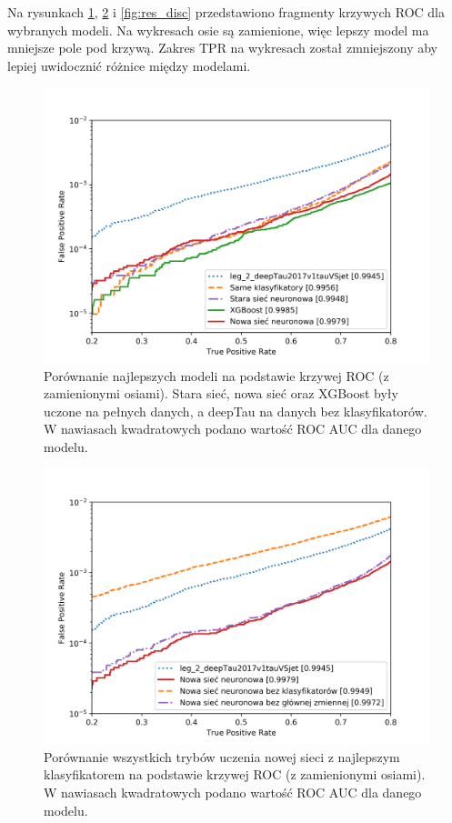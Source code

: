 \documentclass{pracalicmgr}
\begin{document}
	
	Na rysunkach \ref{fig:res_best}, \ref{fig:res_new} i \ref{fig:res_disc} przedstawiono fragmenty krzywych ROC dla wybranych modeli. Na wykresach osie są zamienione, więc lepszy model ma mniejsze pole pod krzywą. Zakres TPR na wykresach został zmniejszony aby lepiej uwidocznić różnice między modelami.
	
	
	
	\begin{figure}
	\centering
	\includegraphics[width=1\textwidth]{best_models.png}
	\caption{Porównanie najlepszych modeli na podstawie krzywej ROC (z zamienionymi osiami).  Stara sieć, nowa sieć oraz XGBoost były uczone na pełnych danych, a deepTau na danych bez klasyfikatorów. W nawiasach kwadratowych podano wartość ROC AUC dla danego modelu.}
	\label{fig:res_best}	
	\end{figure}
	
	\begin{figure}
	\centering
	\includegraphics[width=1\textwidth]{new_network.png}
	\caption{Porównanie wszystkich trybów uczenia nowej sieci z najlepszym klasyfikatorem na podstawie krzywej ROC (z zamienionymi osiami). W nawiasach kwadratowych podano wartość ROC AUC dla danego modelu.}
	\label{fig:res_new}	
	\end{figure}
	
\end{document}
